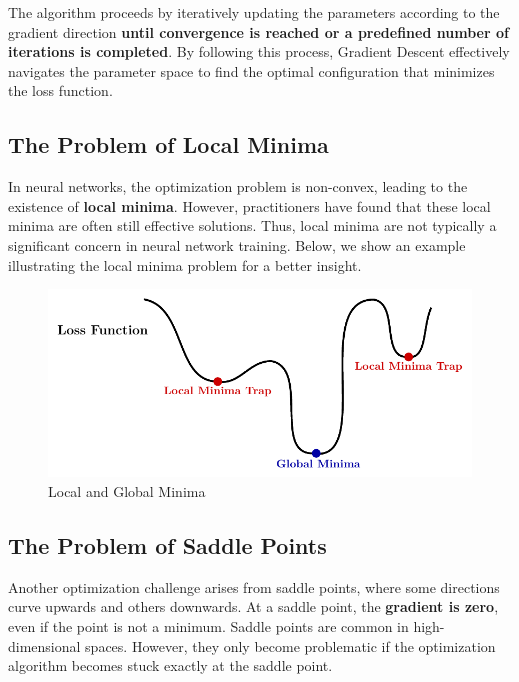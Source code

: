 The algorithm proceeds by iteratively updating the parameters according to the gradient direction \textbf{until convergence is reached or a predefined number of iterations is completed}. By following this process, Gradient Descent effectively navigates the parameter space to find the optimal configuration that minimizes the loss function.


\subsection{The Problem of Local Minima}

In neural networks, the optimization problem is non-convex, leading to the existence of \textbf{local minima}. However, practitioners have found that these local minima are often still effective solutions. Thus, local minima are not typically a significant concern in neural network training. Below, we show an example illustrating the local minima problem for a better insight.

\begin{figure}[!htbp]
    \centering
    \includegraphics[scale=0.9]{tikz/chapter2 - Local Minima.pdf}
    \caption{Local and Global Minima}
\end{figure}

\subsection{The Problem of Saddle Points}

Another optimization challenge arises from saddle points, where some directions curve upwards and others downwards. At a saddle point, the \textbf{gradient is zero}, even if the point is not a minimum. Saddle points are common in high-dimensional spaces. However, they only become problematic if the optimization algorithm becomes stuck exactly at the saddle point.

